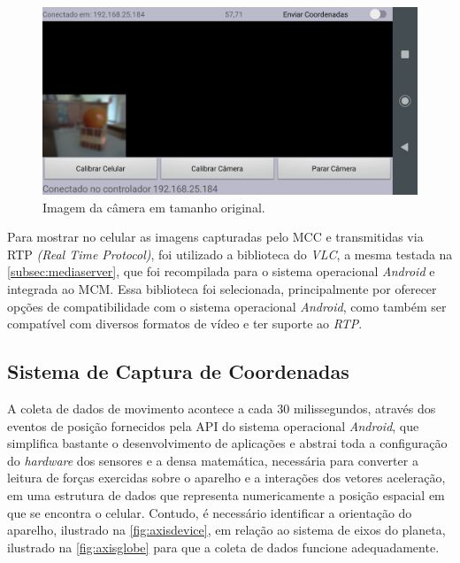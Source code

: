 \begin{figure}[H]
	\centering
	\includegraphics[width=1\textwidth]{figuras/modulo_android_2.png}
	\caption{Imagem da câmera em tamanho original.}
	\label{fig:móduloandroid_cam}
\end{figure}

Para mostrar no celular as imagens capturadas pelo MCC e transmitidas via RTP \textit{(Real Time Protocol)}, foi utilizado a biblioteca do \textit{VLC}, a mesma testada na \autoref{subsec:mediaserver}, que foi recompilada para o sistema operacional \textit{Android} e integrada ao MCM. Essa biblioteca foi selecionada, principalmente por oferecer opções de compatibilidade com o sistema operacional \textit{Android}, como também ser compatível com diversos formatos de vídeo e ter suporte ao \textit{RTP}.\par

\subsection{Sistema de Captura de Coordenadas}
\label{subsec:sistemacapturacoordenadas}

A coleta de dados de movimento acontece a cada 30 milissegundos, através dos eventos de posição fornecidos pela API do sistema operacional \textit{Android}, que simplifica bastante o desenvolvimento de aplicações e abstrai toda a configuração do \textit{hardware} dos sensores e a densa matemática, necessária para converter a leitura de forças exercidas sobre o aparelho e a interações dos vetores aceleração, em uma estrutura de dados que representa numericamente a posição espacial em que se encontra o celular. Contudo, é necessário identificar a orientação do aparelho, ilustrado na \autoref{fig:axisdevice}, em relação ao sistema de eixos do planeta, ilustrado na \autoref{fig:axisglobe} para que a coleta de dados funcione adequadamente.\par

